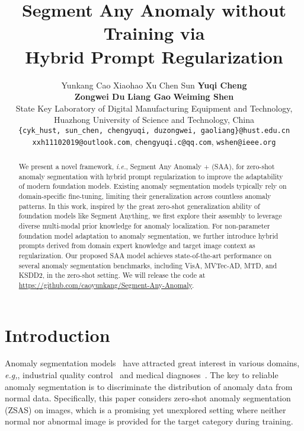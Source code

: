 \documentclass{article}
\title{Segment Any Anomaly without Training via \\  Hybrid Prompt Regularization}
\author{
  Yunkang Cao\footnotemark[1]\quad 
  Xiaohao Xu\footnotemark[1]\quad 
  Chen Sun \quad 
  \textbf{Yuqi Cheng} \\
  \textbf{Zongwei Du} \quad
  \textbf{Liang Gao}  \quad
  \textbf{Weiming Shen\footnotemark[4]} 
  \\
 State Key Laboratory of Digital Manufacturing 
Equipment and Technology,\\ Huazhong University of Science and Technology, China\\
  \texttt{\{cyk\_hust, sun\_chen, chengyuqi, duzongwei, gaoliang\}@hust.edu.cn}  \\  \texttt{xxh11102019@outlook.com}, \texttt{chengyuqi.c@qq.com},  \texttt{wshen@ieee.org} \\
}
\begin{document}
\maketitle

\renewcommand{\thefootnote}{\fnsymbol{footnote}}

\renewcommand{\thefootnote}{\arabic{footnote}}

\begin{abstract}
We present a novel framework, \textit{i.e.}, Segment Any Anomaly + (SAA), for zero-shot anomaly segmentation with hybrid prompt regularization to improve the adaptability of modern foundation models. Existing anomaly segmentation models typically rely on domain-specific fine-tuning, limiting their generalization across countless anomaly patterns. In this work, inspired by the great zero-shot generalization ability of foundation models like Segment Anything, we first explore their assembly to leverage diverse multi-modal prior knowledge for anomaly localization. For non-parameter foundation model adaptation to anomaly segmentation, we further introduce hybrid prompts derived from domain expert knowledge and target image context as regularization. Our proposed SAA model achieves state-of-the-art performance on several anomaly segmentation benchmarks, including VisA, MVTec-AD, MTD, and KSDD2, in the zero-shot setting. We will release the code at \href{https://github.com/caoyunkang/Segment-Any-Anomaly}{https://github.com/caoyunkang/Segment-Any-Anomaly}.





\end{abstract}


\section{Introduction}
\label{sec:intro}
 Anomaly segmentation models~\cite{cao_collaborative_2023, wan_industrial_2022, roth2022towards} have attracted great interest in various domains, \textit{e.g,}, industrial quality control~\cite{bergmann2019mvtec, bergmann2020uninformed} and medical diagnoses~\cite{baur_autoencoders_2021}. The key to reliable anomaly segmentation is to discriminate the distribution of anomaly data from normal data. Specifically, this paper considers zero-shot anomaly segmentation (ZSAS) on images, which is a promising yet unexplored setting where neither normal nor abnormal image is provided for the target category during  training.
\end{document}
